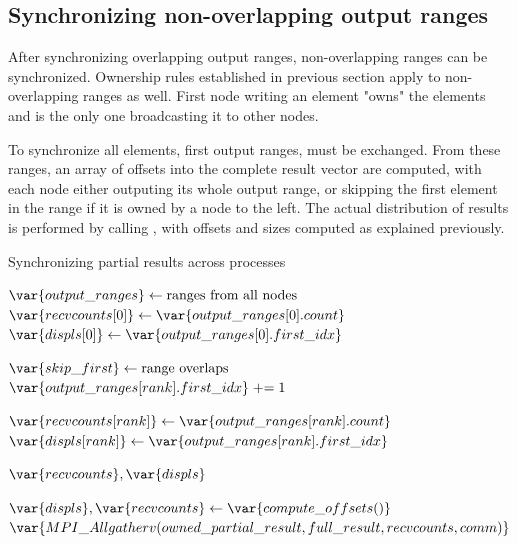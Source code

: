 \documentclass[thesis=M,english]{FITthesis}[2019/12/23]
\begin{document}
\subsection{Synchronizing non-overlapping output ranges}


After synchronizing overlapping output ranges, non-overlapping ranges can be synchronized.
Ownership rules established in previous section apply to non-overlapping ranges as well.
First node writing an element "owns" the elements and is the only one broadcasting it to
other nodes.

To synchronize all elements, first output ranges, must be exchanged. From these ranges,
an array of offsets into the complete result vector are computed, with each node
either outputing its whole output range, or skipping the first element in the range if
it is owned by a node to the left. The actual distribution of results is performed by calling , with
offsets and sizes computed as explained previously.

\newcommand{\pluseq}{\mathrel{+}=}
\begin{algorithm}
    \caption{Synchronizing partial results across processes}
    \begin{algorithmic}
        \State $\var{output\_ranges} \gets \text{ranges from all nodes}$
        \State $\var{recvcounts[0]} \gets \var{output\_ranges[0].count}$
        \State $\var{displs[0]} \gets \var{output\_ranges[0].first\_idx}$


        \State $\var{skip\_first} \gets \text{range overlaps}$
        \State $\var{output\_ranges[rank].first\_idx} \pluseq 1$
        \EndIf

        \State $\var{recvcounts[rank]} \gets \var{output\_ranges[rank].count}$
        \State $\var{displs[rank]} \gets \var{output\_ranges[rank].first\_idx}$

        \EndFor

        \Return $\var{recvcounts}, \var{displs}$

        \EndFunction

        \State $\var{displs}, \var{recvcounts} \gets \var{compute\_offsets()}$
        \State $\var{MPI\_Allgatherv(owned\_partial\_result, full\_result, recvcounts, comm)}$

        \EndFunction
    \end{algorithmic}
\end{algorithm}
\end{document}
